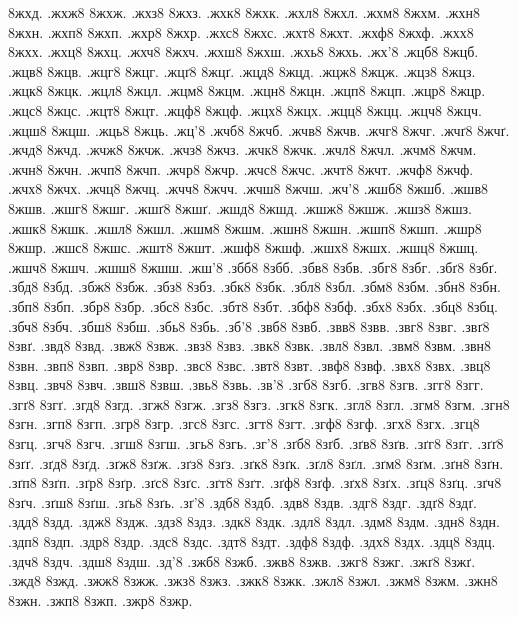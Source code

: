 {8жхд.
.жхж8
8жхж.
.жхз8
8жхз.
.жхк8
8жхк.
.жхл8
8жхл.
.жхм8
8жхм.
.жхн8
8жхн.
.жхп8
8жхп.
.жхр8
8жхр.
.жхс8
8жхс.
.жхт8
8жхт.
.жхф8
8жхф.
.жхх8
8жхх.
.жхц8
8жхц.
.жхч8
8жхч.
.жхш8
8жхш.
.жхь8
8жхь.
.жх'8
.жцб8
8жцб.
.жцв8
8жцв.
.жцг8
8жцг.
.жцґ8
8жцґ.
.жцд8
8жцд.
.жцж8
8жцж.
.жцз8
8жцз.
.жцк8
8жцк.
.жцл8
8жцл.
.жцм8
8жцм.
.жцн8
8жцн.
.жцп8
8жцп.
.жцр8
8жцр.
.жцс8
8жцс.
.жцт8
8жцт.
.жцф8
8жцф.
.жцх8
8жцх.
.жцц8
8жцц.
.жцч8
8жцч.
.жцш8
8жцш.
.жць8
8жць.
.жц'8
.жчб8
8жчб.
.жчв8
8жчв.
.жчг8
8жчг.
.жчґ8
8жчґ.
.жчд8
8жчд.
.жчж8
8жчж.
.жчз8
8жчз.
.жчк8
8жчк.
.жчл8
8жчл.
.жчм8
8жчм.
.жчн8
8жчн.
.жчп8
8жчп.
.жчр8
8жчр.
.жчс8
8жчс.
.жчт8
8жчт.
.жчф8
8жчф.
.жчх8
8жчх.
.жчц8
8жчц.
.жчч8
8жчч.
.жчш8
8жчш.
.жч'8
.жшб8
8жшб.
.жшв8
8жшв.
.жшг8
8жшг.
.жшґ8
8жшґ.
.жшд8
8жшд.
.жшж8
8жшж.
.жшз8
8жшз.
.жшк8
8жшк.
.жшл8
8жшл.
.жшм8
8жшм.
.жшн8
8жшн.
.жшп8
8жшп.
.жшр8
8жшр.
.жшс8
8жшс.
.жшт8
8жшт.
.жшф8
8жшф.
.жшх8
8жшх.
.жшц8
8жшц.
.жшч8
8жшч.
.жшш8
8жшш.
.жш'8
.збб8
8збб.
.збв8
8збв.
.збг8
8збг.
.збґ8
8збґ.
.збд8
8збд.
.збж8
8збж.
.збз8
8збз.
.збк8
8збк.
.збл8
8збл.
.збм8
8збм.
.збн8
8збн.
.збп8
8збп.
.збр8
8збр.
.збс8
8збс.
.збт8
8збт.
.збф8
8збф.
.збх8
8збх.
.збц8
8збц.
.збч8
8збч.
.збш8
8збш.
.збь8
8збь.
.зб'8
.звб8
8звб.
.звв8
8звв.
.звг8
8звг.
.звґ8
8звґ.
.звд8
8звд.
.звж8
8звж.
.звз8
8звз.
.звк8
8звк.
.звл8
8звл.
.звм8
8звм.
.звн8
8звн.
.звп8
8звп.
.звр8
8звр.
.звс8
8звс.
.звт8
8звт.
.звф8
8звф.
.звх8
8звх.
.звц8
8звц.
.звч8
8звч.
.звш8
8звш.
.звь8
8звь.
.зв'8
.згб8
8згб.
.згв8
8згв.
.згг8
8згг.
.згґ8
8згґ.
.згд8
8згд.
.згж8
8згж.
.згз8
8згз.
.згк8
8згк.
.згл8
8згл.
.згм8
8згм.
.згн8
8згн.
.згп8
8згп.
.згр8
8згр.
.згс8
8згс.
.згт8
8згт.
.згф8
8згф.
.згх8
8згх.
.згц8
8згц.
.згч8
8згч.
.згш8
8згш.
.згь8
8згь.
.зг'8
.зґб8
8зґб.
.зґв8
8зґв.
.зґг8
8зґг.
.зґґ8
8зґґ.
.зґд8
8зґд.
.зґж8
8зґж.
.зґз8
8зґз.
.зґк8
8зґк.
.зґл8
8зґл.
.зґм8
8зґм.
.зґн8
8зґн.
.зґп8
8зґп.
.зґр8
8зґр.
.зґс8
8зґс.
.зґт8
8зґт.
.зґф8
8зґф.
.зґх8
8зґх.
.зґц8
8зґц.
.зґч8
8зґч.
.зґш8
8зґш.
.зґь8
8зґь.
.зґ'8
.здб8
8здб.
.здв8
8здв.
.здг8
8здг.
.здґ8
8здґ.
.здд8
8здд.
.здж8
8здж.
.здз8
8здз.
.здк8
8здк.
.здл8
8здл.
.здм8
8здм.
.здн8
8здн.
.здп8
8здп.
.здр8
8здр.
.здс8
8здс.
.здт8
8здт.
.здф8
8здф.
.здх8
8здх.
.здц8
8здц.
.здч8
8здч.
.здш8
8здш.
.зд'8
.зжб8
8зжб.
.зжв8
8зжв.
.зжг8
8зжг.
.зжґ8
8зжґ.
.зжд8
8зжд.
.зжж8
8зжж.
.зжз8
8зжз.
.зжк8
8зжк.
.зжл8
8зжл.
.зжм8
8зжм.
.зжн8
8зжн.
.зжп8
8зжп.
.зжр8
8зжр.
}
